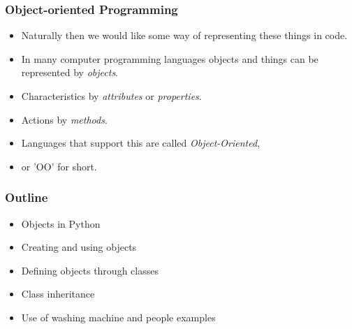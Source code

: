 \documentclass{beamer}
\begin{document}
\begin{frame}[fragile]
\frametitle{Object-oriented Programming}

\begin{itemize}
\item Naturally then we would like some way of representing these things in code.
\item In many computer programming languages objects and things can be represented by \emph{objects}.
\item Characteristics by \emph{attributes} or \emph{properties}.
\item Actions by \emph{methods}.
\item Languages that support this are called \emph{Object-Oriented},
\item or 'OO' for short.
\end{itemize}

\end{frame}

\begin{frame}[fragile]
\frametitle{Outline}

\begin{itemize}
\item Objects in Python
\item Creating and using objects
\item Defining objects through classes
\item Class inheritance
\item Use of washing machine and people examples
\end{itemize}

\end{frame}
\end{document}
